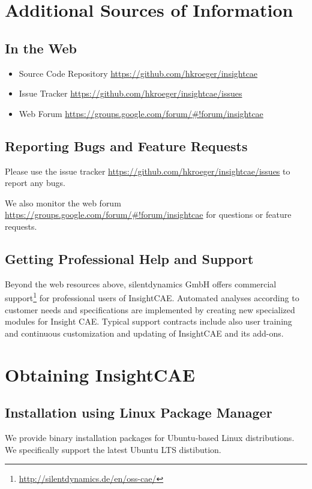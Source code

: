 \section{Additional Sources of Information}

\subsection{In the Web}

\begin{itemize}
\item Source Code Repository \url{https://github.com/hkroeger/insightcae}
\item Issue Tracker \url{https://github.com/hkroeger/insightcae/issues}
\item Web Forum \url{https://groups.google.com/forum/#!forum/insightcae}
\end{itemize}

\subsection{Reporting Bugs and Feature Requests}

Please use the issue tracker \url{https://github.com/hkroeger/insightcae/issues} to report any bugs.

We also monitor the web forum \url{https://groups.google.com/forum/#!forum/insightcae} for questions or feature requests.

\subsection{Getting Professional Help and Support}

Beyond the web resources above, silentdynamics GmbH offers commercial support\footnote{\url{http://silentdynamics.de/en/oss-cae/}} for professional users of InsightCAE. Automated analyses according to customer needs and specifications are implemented  by creating new specialized modules for Insight CAE.
Typical support contracts include also user training and continuous customization and updating of InsightCAE and its add-ons.






\section{Obtaining InsightCAE}
\label{obtaining_insightcae}

\subsection{Installation using Linux Package Manager}
\label{sec:install_apt}
We provide binary installation packages for Ubuntu-based Linux distributions. We specifically support the latest Ubuntu LTS distibution.

